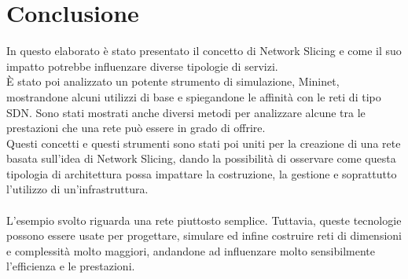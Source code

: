 \chapter*{Conclusione}
{}

In questo elaborato è stato presentato il concetto di Network Slicing e come il suo impatto potrebbe influenzare diverse tipologie di servizi.\\
È stato poi analizzato un potente strumento di simulazione, Mininet, mostrandone alcuni utilizzi di base e spiegandone le affinità con le reti di tipo SDN. Sono stati mostrati anche diversi metodi per analizzare alcune tra le prestazioni che una rete può essere in grado di offrire.\\
Questi concetti e questi strumenti sono stati poi uniti per la creazione di una rete basata sull'idea di Network Slicing, dando la possibilità di osservare come questa tipologia di architettura possa impattare la costruzione, la gestione e soprattutto l'utilizzo di un'infrastruttura.\\\\
L'esempio svolto riguarda una rete piuttosto semplice. Tuttavia, queste tecnologie possono essere usate per progettare, simulare ed infine costruire reti di dimensioni e complessità molto maggiori, andandone ad influenzare molto sensibilmente l'efficienza e le prestazioni. 
